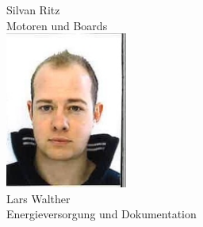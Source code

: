 \begin{minipage}{0.49\textwidth}
\begin{flushleft}
Silvan Ritz\\
Motoren und Boards\\
\includegraphics[width=0.3\textwidth]{./04_Projektmanagement/fig/larswalther.jpg}\\
Lars Walther\\
Energieversorgung und Dokumentation\\
\end{flushleft}
\end{minipage}
\hfill
